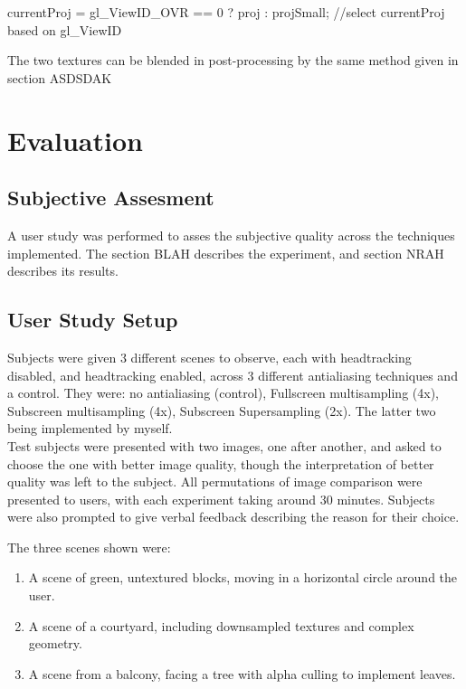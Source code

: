 \documentclass[12pt,a4paper,twoside,openright]{report}
\begin{document}
\begin{blockcode}
currentProj = gl_ViewID_OVR == 0 ? proj : projSmall; //select currentProj based on gl_ViewID 
\end{blockcode}

The two textures can be blended in post-processing by the same method given in section ASDSDAK

\chapter{Evaluation}

\section{Subjective Assesment}

A user study was performed to asses the subjective quality across the techniques implemented. The section BLAH describes the experiment, and section NRAH describes its results.

\section{User Study Setup}

Subjects were given 3 different scenes to observe, each with headtracking disabled, and headtracking enabled, across 3 different antialiasing techniques and a control. They were: no antialiasing (control), Fullscreen multisampling (4x),  Subscreen multisampling (4x), Subscreen Supersampling (2x). The latter two being implemented by myself.\\

Test subjects were presented with two images, one after another, and asked to choose the one with better image quality, though the interpretation of better quality was left to the subject. All permutations of image comparison were presented to users, with each experiment taking around 30 minutes. Subjects were also prompted to give verbal feedback describing the reason for their choice.

The three scenes shown were:

\begin{enumerate}
\item A scene of green, untextured blocks, moving in a horizontal circle around the user.\\

\item A scene of a courtyard, including downsampled textures and complex geometry.\\

\item A scene from a balcony, facing a tree with alpha culling to implement leaves.\\

\end{enumerate} 
\end{document}
